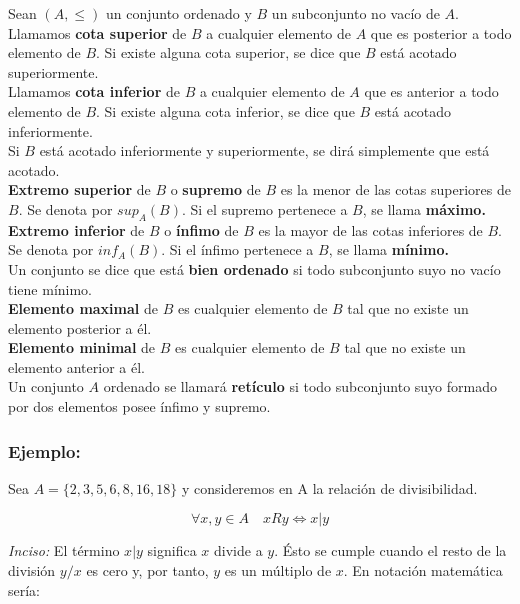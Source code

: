 \documentclass[0_algebra.tex]{subfiles}
\begin{document}
Sean $(A,\leq )$ un conjunto ordenado y $B$ un subconjunto no vacío de $A$.\\

Llamamos \textbf{cota superior} de $B$ a cualquier elemento de $A$ que es posterior a todo elemento de $B$. Si existe alguna cota superior, se dice que $B$ está acotado superiormente.\\

Llamamos \textbf{cota inferior} de $B$ a cualquier  elemento de $A$ que es anterior a todo elemento de $B$. Si existe alguna cota inferior, se dice que $B$ está acotado inferiormente.\\

Si $B$ está acotado inferiormente y superiormente, se dirá simplemente que está acotado.\\

\textbf{Extremo superior} de $B$ o \textbf{supremo} de $B$ es la menor de las cotas superiores de $B$. Se denota por $sup_A(B)$. Si el supremo pertenece a $B$, se llama \textbf{máximo.}\\

\textbf{Extremo inferior} de $B$ o \textbf{ínfimo} de $B$ es la mayor de las cotas inferiores de $B$. Se denota por $inf_A(B)$. Si el ínfimo pertenece a $B$, se llama \textbf{mínimo.}\\

Un conjunto se dice que está \textbf{bien ordenado} si todo subconjunto suyo no vacío tiene mínimo.\\

\textbf{Elemento maximal} de $B$ es cualquier elemento de $B$ tal que no existe un elemento posterior a él.\\

\textbf{Elemento minimal} de $B$ es cualquier elemento de $B$ tal que no existe un elemento anterior a él.\\

Un conjunto $A$ ordenado se llamará \textbf{retículo} si todo subconjunto suyo formado por dos elementos posee ínfimo y supremo.\\

\subsubsection*{Ejemplo:}
Sea $A=\lbrace 2,3,5,6,8,16,18 \rbrace$ y consideremos en A la relación de divisibilidad.

$$
\forall x,y \in A \quad x R y \Leftrightarrow x|y
$$

\emph{Inciso: }El término $x|y$ significa $x$ divide a $y$. Ésto se cumple cuando el resto de la división $y/x$ es cero y, por tanto, $y$ es un múltiplo de $x$. En notación matemática sería:
\end{document}
